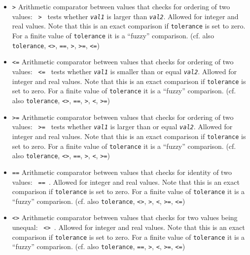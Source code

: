 \documentclass[12pt]{book}
\newcommand{\ttt}[1]{\texttt{#1}}
\begin{document}
\begin{itemize}
\ttt{==}, \ttt{>}, \ttt{>=}, \ttt{<=})
\item
\ttt{>} \newline
Arithmetic comparator between values that checks for ordering
of two values: \ttt{{\em <val1>} > {\em <val2>}} tests whether
\ttt{{\em val1}} is larger than \ttt{{\em val2}}. Allowed for
integer and real values. Note that this is an exact comparison if
\ttt{tolerance} is set to zero. For a finite value of \ttt{tolerance}
it is a ``fuzzy'' comparison. (cf. also \ttt{tolerance}, \ttt{<>},
\ttt{==}, \ttt{>}, \ttt{>=}, \ttt{<=})
\item
\ttt{<=} \newline
Arithmetic comparator between values that checks for ordering
of two values: \ttt{{\em <val1>} <= {\em <val2>}} tests whether
\ttt{{\em val1}} is smaller than or equal \ttt{{\em val2}}. Allowed for
integer and real values. Note that this is an exact comparison if
\ttt{tolerance} is set to zero. For a finite value of \ttt{tolerance}
it is a ``fuzzy'' comparison. (cf. also \ttt{tolerance}, \ttt{<>},
\ttt{==}, \ttt{>}, \ttt{<}, \ttt{>=})
\item
\ttt{>=} \newline
Arithmetic comparator between values that checks for ordering
of two values: \ttt{{\em <val1>} >= {\em <val2>}} tests whether
\ttt{{\em val1}} is larger than or equal \ttt{{\em val2}}. Allowed for
integer and real values. Note that this is an exact comparison if
\ttt{tolerance} is set to zero. For a finite value of \ttt{tolerance}
it is a ``fuzzy'' comparison. (cf. also \ttt{tolerance}, \ttt{<>},
\ttt{==}, \ttt{>}, \ttt{<}, \ttt{>=})
\item
\ttt{==} \newline
Arithmetic comparator between values that checks for identity
of two values: \ttt{{\em <val1>} == {\em <val2>}}. Allowed for
integer and real values. Note that this is an exact comparison if
\ttt{tolerance} is set to zero. For a finite value of \ttt{tolerance}
it is a ``fuzzy'' comparison. (cf. also \ttt{tolerance}, \ttt{<>},
\ttt{>}, \ttt{<}, \ttt{>=}, \ttt{<=})
\item
\ttt{<>} \newline
Arithmetic comparator between values that checks for
two values being unequal: \ttt{{\em <val1>} <> {\em <val2>}}. Allowed for
integer and real values. Note that this is an exact comparison if
\ttt{tolerance} is set to zero. For a finite value of \ttt{tolerance}
it is a ``fuzzy'' comparison. (cf. also \ttt{tolerance}, \ttt{==},
\ttt{>}, \ttt{<}, \ttt{>=}, \ttt{<=})

\end{itemize}
\end{document}
